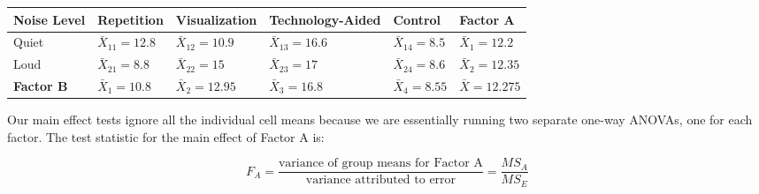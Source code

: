 \documentclass[
  letterpaper,
  DIV=11,
  numbers=noendperiod]{scrreprt}
\begin{document}
\begin{longtable}[]{@{}
  >{\raggedright\arraybackslash}p{}
  >{\raggedright\arraybackslash}p{}
  >{\raggedright\arraybackslash}p{}
  >{\raggedright\arraybackslash}p{}
  >{\raggedright\arraybackslash}p{}
  >{\raggedright\arraybackslash}p{}@{}}
\toprule\noalign{}
\begin{minipage}[b]{\linewidth}\raggedright
Noise Level
\end{minipage} & \begin{minipage}[b]{\linewidth}\raggedright
Repetition
\end{minipage} & \begin{minipage}[b]{\linewidth}\raggedright
Visualization
\end{minipage} & \begin{minipage}[b]{\linewidth}\raggedright
Technology-Aided
\end{minipage} & \begin{minipage}[b]{\linewidth}\raggedright
Control
\end{minipage} & \begin{minipage}[b]{\linewidth}\raggedright
Factor A
\end{minipage} \\
\midrule\noalign{}
\endhead
\bottomrule\noalign{}
\endlastfoot
Quiet & \(\bar{X}_{11} = 12.8\) & \(\bar{X}_{12} = 10.9\) &
\(\bar{X}_{13} = 16.6\) & \(\bar{X}_{14} = 8.5\) &
\(\bar{X}_1 = 12.2\) \\
Loud & \(\bar{X}_{21} = 8.8\) & \(\bar{X}_{22} = 15\) &
\(\bar{X}_{23} = 17\) & \(\bar{X}_{24} = 8.6\) &
\(\bar{X}_2 = 12.35\) \\
\textbf{Factor B} & \(\bar{X}_1 = 10.8\) & \(\bar{X}_2 = 12.95\) &
\(\bar{X}_3 = 16.8\) & \(\bar{X}_4 = 8.55\) & \(\bar{X} = 12.275\) \\
\end{longtable}

Our main effect tests ignore all the individual cell means because we
are essentially running two separate one-way ANOVAs, one for each
factor. The test statistic for the main effect of Factor A is:

\[
F_A = \frac{\text{variance of group means for Factor A}}{\text{variance attributed to error}} = \frac{MS_A}{MS_E}
\]
\end{document}

